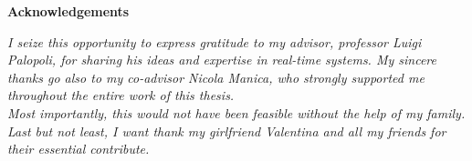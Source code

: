 \thispagestyle{empty}

\begin{center}
  {\bf \Huge Acknowledgements}
\end{center}
\vspace{4cm}


\emph{
    I seize this opportunity to express gratitude to my advisor, professor Luigi
    Palopoli, for sharing his ideas and expertise in real-time systems.
    My sincere thanks go also to my co-advisor Nicola Manica, who strongly
    supported me throughout the entire work of this thesis.\\
    Most importantly, this would not have been feasible without the help
    of my family. Last but not least, I want thank my girlfriend Valentina
    and all my friends for their essential contribute.
}
